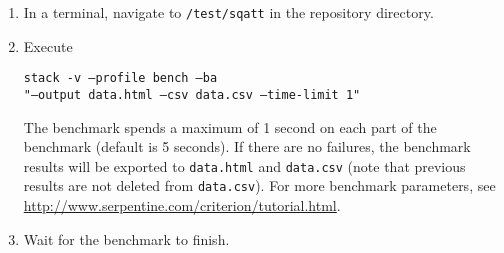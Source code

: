 \begin{enumerate}
\item In a terminal, navigate to \texttt{/test/sqatt} in the repository directory.
\item Execute
\begin{center}
\texttt{stack -v --profile bench --ba} \\
\texttt{"--output data.html --csv data.csv --time-limit 1"}
\end{center}

The benchmark spends a maximum of 1 second on each part of the benchmark (default is 5 seconds).
If there are no failures, the benchmark results will be exported to \texttt{data.html} and \texttt{data.csv} (note that previous results are not deleted from \texttt{data.csv}).
For more benchmark parameters, see \url{http://www.serpentine.com/criterion/tutorial.html}.

\item Wait for the benchmark to finish.
\end{enumerate}





